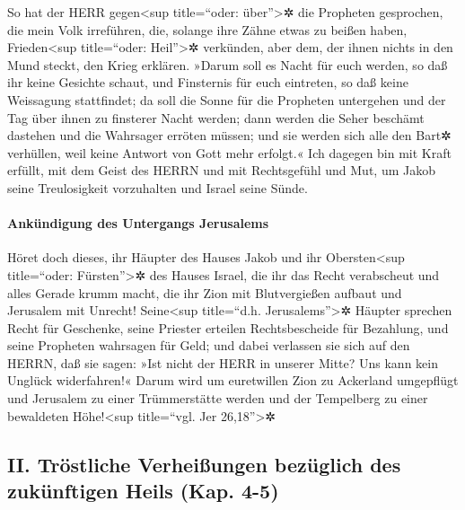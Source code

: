  So hat der HERR gegen\textless sup title=``oder:
über''\textgreater✲ die Propheten gesprochen, die mein Volk irreführen,
die, solange ihre Zähne etwas zu beißen haben, Frieden\textless sup
title=``oder: Heil''\textgreater✲ verkünden, aber dem, der ihnen nichts
in den Mund steckt, den Krieg erklären.  »Darum soll es
Nacht für euch werden, so daß ihr keine Gesichte schaut, und Finsternis
für euch eintreten, so daß keine Weissagung stattfindet; da soll die
Sonne für die Propheten untergehen und der Tag über ihnen zu finsterer
Nacht werden;  dann werden die Seher beschämt dastehen und
die Wahrsager erröten müssen; und sie werden sich alle den Bart✲
verhüllen, weil keine Antwort von Gott mehr erfolgt.«  Ich
dagegen bin mit Kraft erfüllt, mit dem Geist des HERRN und mit
Rechtsgefühl und Mut, um Jakob seine Treulosigkeit vorzuhalten und
Israel seine Sünde.

\hypertarget{ankuxfcndigung-des-untergangs-jerusalems}{%
\paragraph{Ankündigung des Untergangs
Jerusalems}\label{ankuxfcndigung-des-untergangs-jerusalems}}

 Höret doch dieses, ihr Häupter des Hauses Jakob und ihr
Obersten\textless sup title=``oder: Fürsten''\textgreater✲ des Hauses
Israel, die ihr das Recht verabscheut und alles Gerade krumm macht,
 die ihr Zion mit Blutvergießen aufbaut und Jerusalem mit
Unrecht!  Seine\textless sup title=``d.h.
Jerusalems''\textgreater✲ Häupter sprechen Recht für Geschenke, seine
Priester erteilen Rechtsbescheide für Bezahlung, und seine Propheten
wahrsagen für Geld; und dabei verlassen sie sich auf den HERRN, daß sie
sagen: »Ist nicht der HERR in unserer Mitte? Uns kann kein Unglück
widerfahren!«  Darum wird um euretwillen Zion zu
Ackerland umgepflügt und Jerusalem zu einer Trümmerstätte werden und der
Tempelberg zu einer bewaldeten Höhe!\textless sup title=``vgl. Jer
26,18''\textgreater✲

\hypertarget{ii.-truxf6stliche-verheiuxdfungen-bezuxfcglich-des-zukuxfcnftigen-heils-kap.-4-5}{%
\subsection{II. Tröstliche Verheißungen bezüglich des zukünftigen Heils
(Kap.
4-5)}\label{ii.-truxf6stliche-verheiuxdfungen-bezuxfcglich-des-zukuxfcnftigen-heils-kap.-4-5}}

